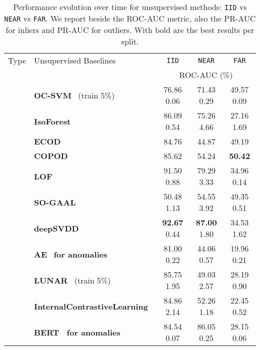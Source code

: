 \documentclass{article}
\begin{document}
\begingroup
\setlength{\tabcolsep}{4pt} \begin{table}[t]
\begin{center}
    \caption{Performance evolution over time for unsupervised methods: \texttt{IID} vs \texttt{NEAR} vs \texttt{FAR}. We report beside the ROC-AUC metric, also the PR-AUC for inliers and PR-AUC for outliers. With bold are the best results per split.}
    
    \begin{tabular}{c l c c c}\toprule
    Type & Unsupervised Baselines & \texttt{IID} & \texttt{NEAR} & \texttt{FAR}  \\
    \cmidrule(lr){3-5}
    & & \multicolumn{3}{c}{ROC-AUC (\%) } \\
    \midrule
    \parbox[t]{2mm}{} & \textbf{OC-SVM}~\cite{ocsvm} (train 5\%)  & 76.86  \small 0.06 & 71.43  \small 0.29 & 49.57  \small 0.09\\    
    &\textbf{IsoForest}~\cite{isoforest} & 86.09  \small 0.54 & 75.26  \small 4.66 & 27.16  \small 1.69\\
    &\textbf{ECOD}~\cite{ecod} & 84.76 & 44.87 & 49.19 \\
    &\textbf{COPOD}~\cite{copod} & 85.62 & 54.24 & \textbf{50.42} \\
    &\textbf{LOF}~\cite{lof} & 91.50  \small 0.88 & 79.29  \small 3.33 & 34.96  \small 0.14 \\
    \cmidrule(lr){2-5}
    \parbox[t]{2mm}{} 
    & \textbf{SO-GAAL}~\cite{mo_gaal} & 50.48  \small 1.13 & 54.55  \small 3.92 & 49.35  \small 0.51\\
    &\textbf{deepSVDD}~\cite{deepsvdd} & \textbf{92.67}  \small 0.44 & \textbf{87.00}  \small 1.80 & 34.53  \small 1.62 \\
&\textbf{AE}~\cite{autoencoder} \textbf{for anomalies} & 81.00  \small 0.22 & 44.06  \small 0.57 & 19.96  \small 0.21 \\
    &\textbf{LUNAR}~\cite{lunar} (train 5\%) & 85.75  \small 1.95 & 49.03
     \small 2.57 & 28.19  \small 0.90 \\ 
     &\textbf{InternalContrastiveLearning}~\cite{icl} & 84.86  \small 2.14 & 52.26  \small 1.18 & 22.45  \small 0.52\\
    &\textbf{BERT~\cite{bert} for anomalies} & 84.54  \small 0.07 & 86.05  \small 0.25 & 28.15  \small 0.06 \\
  

    \midrule
   

\end{tabular}
\end{center}
\end{table}
\end{document}
